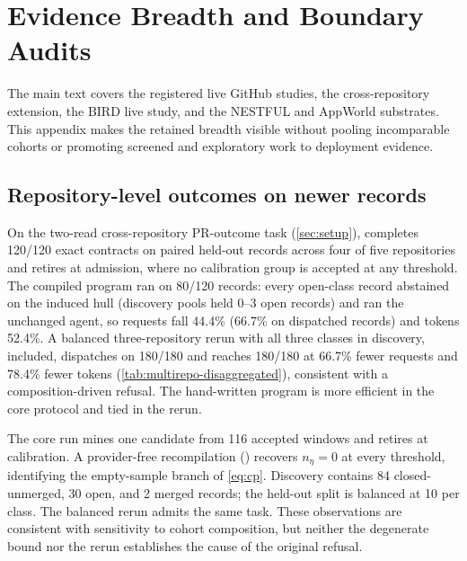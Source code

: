 \section{Evidence Breadth and Boundary Audits}
\label{app:breadth}

The main text covers the registered live GitHub studies, the cross-repository
extension, the BIRD live study, and the NESTFUL and AppWorld substrates. This
appendix makes the retained breadth visible without pooling incomparable cohorts
or promoting screened and exploratory work to deployment evidence.

\subsection{Repository-level outcomes on newer records}
On the two-read cross-repository PR-outcome task (\cref{sec:setup}), \method
completes 120/120 exact contracts on paired held-out records across four of
five repositories and retires  at admission, where no
calibration group is accepted at any threshold. The compiled program ran on
80/120 records: every open-class record abstained on the induced
 hull (discovery pools held 0--3 open records) and ran the
unchanged agent, so requests fall 44.4\% (66.7\% on dispatched records) and
tokens 52.4\%. A balanced three-repository rerun with all three classes in
discovery,  included, dispatches on 180/180 and reaches
180/180 at 66.7\% fewer requests and 78.4\% fewer tokens
(\cref{tab:multirepo-disaggregated}), consistent with a composition-driven
refusal. The hand-written program is more efficient in the core protocol and
tied in the rerun.

The core  run mines one candidate from 116 accepted
windows and retires at calibration. A provider-free recompilation
() recovers
$n_\eta=0$ at every threshold, identifying the empty-sample branch of
\cref{eq:cp}. Discovery contains 84 closed-unmerged, 30 open, and 2 merged
records; the held-out split is balanced at 10 per class. The balanced rerun
admits the same task. These observations are consistent with sensitivity to
cohort composition, but neither the degenerate bound nor the rerun establishes
the cause of the original refusal.

\begin{table}[t]
  \centering
  \caption{Held-out dispatch in the cross-repository studies. ``Dispatched''
  counts records on which the compiled program ran; the remainder abstained on
  the named verifier clause and ran the unchanged agent, which is why the
  request reduction is 44.4\% under the core protocol and 66.7\% under the
  balanced one for the same two-read artifact.}
  \label{tab:multirepo-dispatch}
  \footnotesize
  \setlength{\tabcolsep}{3.5pt}
  
\end{table}

